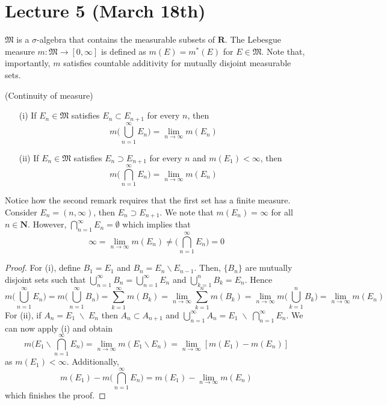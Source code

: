 \section{Lecture 5 (March 18th)}
\begin{recall}
	$\mathfrak{M}$ is a $\sigma $-algebra that contains the measurable subsets of ${\bm R}$. The Lebesgue measure $m:\mathfrak{M}\rightarrow [0,\infty ]$ is defined as $m(E)=m^{*}(E)$ for $E\in \mathfrak{M}$. Note that, importantly, $m$ satisfies countable additivity for mutually disjoint measurable sets.
\end{recall}
\vspace{2ex}
\begin{thm}
(Continuity of measure) 
\begin{itemize}
	\item[(i)] If $E_{n}\in \mathfrak{M}$ satisfies $E_{n}\subset E_{n+1}$ for every $n$, then 
\[m\Big(\bigcup _{n=1}^{\infty }E_{n}\Big)=\lim _{n\rightarrow \infty }m(E_{n})\]  
	\item[(ii)] If $E_{n}\in \mathfrak{M}$ satisfies $E_{n}\supset E_{n+1}$ for every $n$ and $m(E_{1})<\infty $, then 
\[m\Big(\bigcap ^{\infty }_{n=1}E_{n}\Big)=\lim _{n\rightarrow \infty }m(E_{n})\]
\end{itemize}
\end{thm}
\vspace{2ex}
\begin{ex}
Notice how the second remark requires that the first set has a finite measure. Consider $E_{n}=(n,\infty )$, then $E_{n}\supset E_{n+1}$. We note that $m(E_{n})=\infty $ for all $n\in {\bm N}$. However, $\bigcap ^{\infty }_{n=1}E_{n}=\emptyset$ which implies that
\[\infty =\lim _{n\rightarrow \infty }m(E_{n})\ne \Big(\bigcap ^{\infty }_{n=1}E_{n}\Big)=0\]
\end{ex}
\vspace{2ex}
\begin{proof}
For (i), define $B_1=E_1$ and $B_{n}=E_{n}\backslash E_{n-1}$. Then, $\{B_{n}\}$ are mutually disjoint sets such that $\bigcup ^{\infty }_{n=1}B_{n}=\bigcup ^{\infty }_{n=1}E_{n}$ and $\bigcup^{n}_{k=1}B_{k}=E_{n}$. Hence 
\[m\Big(\bigcup ^{\infty }_{n=1}E_{n}\Big)=m\Big(\bigcup ^{\infty }_{n=1}B_{n}\Big)=\sum ^{\infty }_{k=1}m(B_{k})=\lim _{n\rightarrow \infty }\sum ^{n}_{k=1}m(B_{k})=\lim _{n\rightarrow \infty }m\Big(\bigcup ^{n}_{k=1}B_{k}\Big)=\lim _{n\rightarrow \infty }m(E_{n})\]
For (ii), if $A_{n}=E_1\;\backslash\;E_{n}$ then $A_{n}\subset A_{n+1}$ and $\bigcup ^{\infty }_{n=1}A_{n}=E_{1}\;\backslash\; \bigcap ^{\infty }_{n=1}E_{n}$. We can now apply (i) and obtain
\[m\Big(E_1\backslash \bigcap ^{\infty }_{n=1}E_{n}\Big)=\lim _{n\rightarrow \infty }m(E_1\backslash E_{n})=\lim _{n\rightarrow \infty }[m(E_1)-m(E_{n})]\]
as $m(E_{1})<\infty $. Additionally,
\[ m(E_1)-m\Big(\bigcap ^{\infty }_{n=1}E_{n}\Big)=m(E_1)-\lim _{n\rightarrow \infty }m(E_{n})\]
which finishes the proof.
\end{proof}
